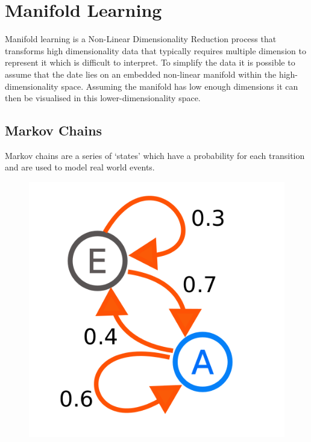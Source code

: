 \section{Manifold Learning}
Manifold learning is a Non-Linear Dimensionality Reduction process that transforms high dimensionality data that typically requires multiple dimension to represent it which is difficult to interpret. To simplify the data it is possible to assume that the date lies on an embedded non-linear manifold within the high-dimensionality space. Assuming the manifold has low enough dimensions it can then be visualised in this lower-dimensionality space.

\subsection{Markov Chains}
Markov chains are a series of `states' which have a probability for each transition and are used to model real world events.


\begin{figure}[h]
    \centering
    \includegraphics[height=0.25\textheight]{fig03/markov}
    \label{fig:kinect}
\end{figure}

